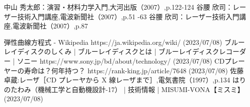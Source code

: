 \documentclass[a4paper,12pt]{jsarticle}
\begin{document}
\begin{thebibliography}{20}
  \bibitem{} 
  中山 秀太郎：演習・材料力学入門,大河出版（2007）,p.122-124
  \bibitem{} 
  谷腰 欣司：レーザー技術入門講座,電波新聞社（2007）,p.51 -63
  \bibitem{}
  谷腰 欣司：レーザー技術入門講座,電波新聞社（2007）,p.87
  
  \bibitem{}
  弾性曲線方程式 - Wikipedia https://ja.wikipedia.org/wiki/ (2023/07/08)
  \bibitem{} 
  ブルーレイディスクのしくみ | ブルーレイディスクとは | ブルーレイディスクレコーダー | ソニー https://www.sony.jp/bd/about/technology/ (2023/07/08)
  \bibitem{} 
  CDプレーヤーの寿命は？何年持つ？ https://rank-king.jp/article/7648 (2023/07/08)
  \bibitem{}
  佐藤卓蔵:レーザ［CD プレーヤから X 線レーザまで］,電気書院（1997）,p.134
  \bibitem{}
  はりのたわみ（機械工学と自動機設計-17） | 技術情報 | MISUMI-VONA【ミスミ】(2023/07/08)
\end{thebibliography}
\end{document}
